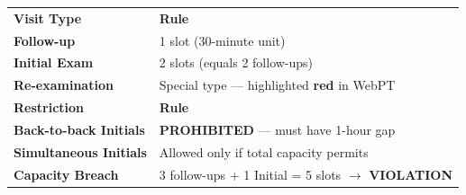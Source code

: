 \documentclass[11pt,a4paper]{article}
\begin{document}
\begin{tcolorbox}[warnbox,title={Green Board Capacity Rules}]
\begin{tabularx}{\linewidth}{L{3.8cm} X}
  \color{white}\textbf{Visit Type} & \color{white}\textbf{Rule} \\
  \textbf{Follow-up}       & 1 slot (30-minute unit) \\
  \textbf{Initial Exam}    & 2 slots (equals 2 follow-ups) \\
  \textbf{Re-examination}  & Special type --- highlighted \textcolor{DangerRed}{\textbf{red}} in WebPT \\[0.3em]
  \color{white}\textbf{Restriction} & \color{white}\textbf{Rule} \\
  \textbf{Back-to-back Initials} & \textcolor{DangerRed}{\bfseries PROHIBITED} --- must have 1-hour gap \\
  \textbf{Simultaneous Initials} & Allowed only if total capacity permits \\
  \textbf{Capacity Breach} & 3 follow-ups + 1 Initial = 5 slots $\rightarrow$ \textcolor{DangerRed}{\bfseries VIOLATION} \\
\end{tabularx}
\end{tcolorbox}
\end{document}
